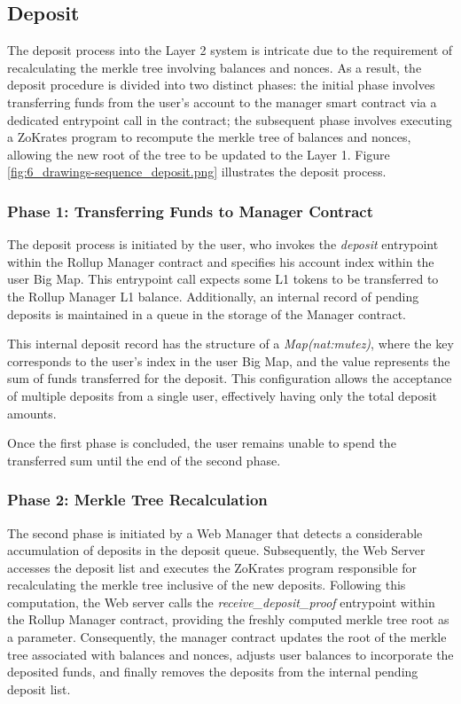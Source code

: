 \subsection{Deposit\label{subsec:deposit}}
The deposit process into the Layer 2 system is intricate due to the requirement of recalculating the merkle tree involving balances and nonces. As a result, the deposit procedure is divided into two distinct phases: the initial phase involves transferring funds from the user's account to the manager smart contract via a dedicated entrypoint call in the contract; the subsequent phase involves executing a ZoKrates program to recompute the merkle tree of balances and nonces, allowing the new root of the tree to be updated to the Layer 1. Figure \ref{fig:6_drawings-sequence_deposit.png} illustrates the deposit process.

\subsubsection{Phase 1: Transferring Funds to Manager Contract}
The deposit process is initiated by the user, who invokes the \textit{deposit} entrypoint within the Rollup Manager contract and specifies his account index within the user Big Map. This entrypoint call expects some L1 tokens to be transferred to the Rollup Manager L1 balance. Additionally, an internal record of pending deposits is maintained in a queue in the storage of the Manager contract.

This internal deposit record has the structure of a \textit{Map(nat:mutez)}, where the key corresponds to the user's index in the user Big Map, and the value represents the sum of funds transferred for the deposit. This configuration allows the acceptance of multiple deposits from a single user, effectively having only the total deposit amounts.

Once the first phase is concluded, the user remains unable to spend the transferred sum until the end of the second phase.

\subsubsection{Phase 2: Merkle Tree Recalculation}
The second phase is initiated by a Web Manager that detects a considerable accumulation of deposits in the deposit queue. Subsequently, the Web Server accesses the deposit list and executes the ZoKrates program responsible for recalculating the merkle tree inclusive of the new deposits. Following this computation, the Web server calls the \textit{receive\_deposit\_proof} entrypoint within the Rollup Manager contract, providing the freshly computed merkle tree root as a parameter. Consequently, the manager contract updates the root of the merkle tree associated with balances and nonces, adjusts user balances to incorporate the deposited funds, and finally removes the deposits from the internal pending deposit list.


